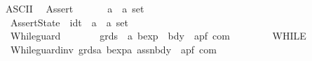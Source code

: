 \begin{isabellebody}
\isanewline
{}\isamarkupfalse%
\ {\isacharparenleft}ASCII{\isacharparenright}\isanewline
\ \ {\isachardoublequoteopen}{\isacharunderscore}Assert{\isachardoublequoteclose}\ \ \ \ \ \ {\isacharcolon}{\isacharcolon}\ {\isachardoublequoteopen}{\isacharprime}a\ {\isacharequal}{\isachargreater}\ {\isacharprime}a\ set{\isachardoublequoteclose}\ \ \ \ \ \ \ \ \ \ \ {\isacharparenleft}{\isachardoublequoteopen}{\isacharparenleft}{\isacharbraceleft}{\isacharbar}{\isacharunderscore}{\isacharbar}{\isacharbraceright}{\isacharparenright}{\isachardoublequoteclose}\ {\isacharbrackleft}{}{\isacharbrackright}\ {}{}{}{}{\isacharparenright}\isanewline
\ \ {\isachardoublequoteopen}{\isacharunderscore}AssertState{\isachardoublequoteclose}\ {\isacharcolon}{\isacharcolon}\ {\isachardoublequoteopen}idt\ {\isasymRightarrow}\ {\isacharprime}a\ {\isasymRightarrow}\ {\isacharprime}a\ set{\isachardoublequoteclose}\ \ \ \ {\isacharparenleft}{\isachardoublequoteopen}{\isacharparenleft}{\isacharbraceleft}{\isacharbar}{\isacharunderscore}{\isachardot}\ {\isacharunderscore}{\isacharbar}{\isacharbraceright}{\isacharparenright}{\isachardoublequoteclose}\ {\isacharbrackleft}{}{}{}{}{\isacharcomma}{}{\isacharbrackright}\ {}{}{}{}{\isacharparenright}\isanewline
\ \ {\isachardoublequoteopen}{\isacharunderscore}While{\isacharunderscore}guard{\isachardoublequoteclose}\ \ \ \ \ \ \ {\isacharcolon}{\isacharcolon}\ {\isachardoublequoteopen}grds\ {\isacharequal}{\isachargreater}\ {\isacharprime}a\ bexp\ {\isacharequal}{\isachargreater}\ bdy\ {\isasymRightarrow}\ {\isacharparenleft}{\isacharprime}a{\isacharcomma}{\isacharprime}p{\isacharcomma}{\isacharprime}f{\isacharparenright}\ com{\isachardoublequoteclose}\isanewline
\ \ \ \ \ \ \ \ {\isacharparenleft}{\isachardoublequoteopen}{\isacharparenleft}{}WHILE\ {\isacharparenleft}{\isacharunderscore}{\isacharbar}{\isacharminus}{\isachargreater}\ {\isacharslash}{\isacharunderscore}{\isacharparenright}\ {\isacharslash}{\isacharunderscore}{\isacharparenright}{\isachardoublequoteclose}\ \ {\isacharbrackleft}{}{\isacharcomma}{}{\isacharcomma}{}{}{}{}{\isacharbrackright}\ {}{}{\isacharparenright}\isanewline
\ \ {\isachardoublequoteopen}{\isacharunderscore}While{\isacharunderscore}guard{\isacharunderscore}inv{\isachardoublequoteclose}{\isacharcolon}{\isacharcolon}\ {\isachardoublequoteopen}grds{\isasymRightarrow}{\isacharprime}a\ bexp{\isasymRightarrow}{\isacharprime}a\ assn{\isasymRightarrow}bdy\ {\isasymRightarrow}\ {\isacharparenleft}{\isacharprime}a{\isacharcomma}{\isacharprime}p{\isacharcomma}{\isacharprime}f{\isacharparenright}\ com{\isachardoublequoteclose}\isanewline

\end{isabellebody}
